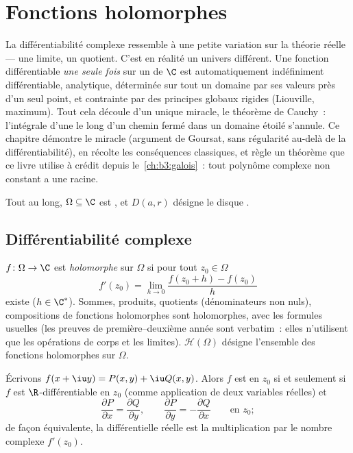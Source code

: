 \chapter{Fonctions holomorphes}\label{ch:b3:holomorphic}

La différentiabilité complexe ressemble à une petite variation
sur la théorie réelle --- une limite, un quotient. C'est en
réalité un univers différent. Une fonction différentiable
\emph{une seule fois} sur un  de $\C$ est automatiquement
indéfiniment différentiable, analytique, déterminée sur tout un
domaine par ses valeurs près d'un seul point, et contrainte par
des principes globaux rigides (Liouville,  maximum). Tout
cela découle d'un unique miracle, le théorème de Cauchy~: l'intégrale
d'une  le long d'un chemin fermé dans un domaine
étoilé s'annule. Ce chapitre démontre le miracle (argument de
Goursat, sans régularité au-delà de la différentiabilité), en
récolte les conséquences classiques, et règle un théorème que
ce livre utilise à crédit depuis le~\cref{ch:b3:galois}~: tout
polynôme complexe non constant a une racine.

Tout au long, $\Omega \subseteq \C$ est , et $D(a, r)$
désigne le disque .

\section{Différentiabilité complexe}

\begin{definition}\label{def:b3:holomorphic:holo}
$f \colon \Omega \to \C$ est \emph{holomorphe} sur $\Omega$ si pour tout $z_0 \in \Omega$
\[
f'(z_0) = \lim_{h\to0}\frac{f(z_0 + h) - f(z_0)}{h}
\]
existe ($h \in \C^*$). Sommes, produits, quotients (dénominateurs
non nuls), compositions de fonctions holomorphes sont
holomorphes, avec les formules usuelles (les preuves de
première--deuxième année sont verbatim~: elles n'utilisent que
les opérations de corps et les limites). $\mathcal H(\Omega)$
désigne l'ensemble des fonctions holomorphes sur $\Omega$.
\end{definition}

\begin{proposition}
\label{prop:b3:holomorphic:cauchyriemann}
Écrivons $f(x + \iu y) = P(x,y) + \iu Q(x,y)$. Alors $f$ est
 en $z_0$ si et seulement si $f$ est $\R$-différentiable
en $z_0$ (comme application de deux variables réelles)
et
\[
\frac{\partial P}{\partial x} = \frac{\partial Q}{\partial y},
\qquad
\frac{\partial P}{\partial y} = -\frac{\partial Q}{\partial x}
\qquad \text{en } z_0 ;
\]
de façon équivalente, la différentielle réelle est la
multiplication par le nombre complexe $f'(z_0)$.
\end{proposition}

